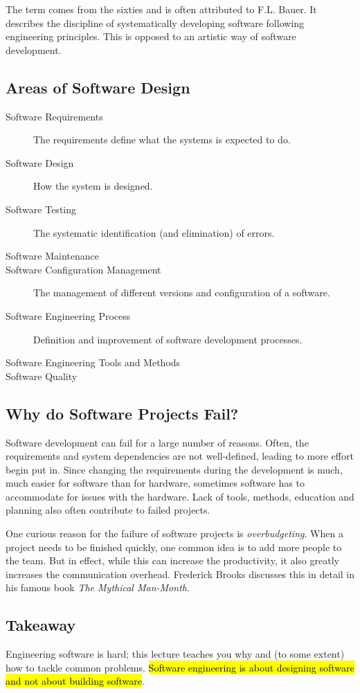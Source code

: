 \documentclass[english]{scrartcl}
\begin{document}
The term comes from the sixties and is often attributed to F.L. Bauer. It describes the discipline of systematically developing software following engineering principles. This is opposed to an artistic way of software development.

\subsection{Areas of Software Design}


\begin{description}
\item[Software Requirements] The requirements define what the systems is expected to do.
\item[Software Design] How the system is designed.
\item[Software Testing] The systematic identification (and elimination) of errors.
\item[Software Maintenance]
\item[Software Configuration Management] The management of different versions and configuration of a software.
\item[Software Engineering Process] Definition and improvement of software development processes.
\item[Software Engineering Tools and Methods]
\item[Software Quality]
\end{description}

\subsection{Why do Software Projects Fail?}

Software development can fail for a large number of reasons. Often, the requirements and system dependencies are not well-defined, leading to more effort begin put in. Since changing the requirements during the development is much, much easier for software than for hardware, sometimes software has to accommodate for issues with the hardware. Lack of tools, methods, education and planning also often contribute to failed projects.

\begin{anmerkung}
One curious reason for the failure of software projects is \emph{overbudgeting}. When a project needs to be finished quickly, one common idea is to add more people to the team. But in effect, while this can increase the productivity, it also greatly increases the communication overhead. Frederick Brooks discusses this in detail in his famous book \emph{The Mythical Man-Month}.
\end{anmerkung}


\subsection{Takeaway}

Engineering software is hard; this lecture teaches you why and (to some extent) how to tackle common problems.
\hl{Software engineering is about designing software and not about building software}.
\end{document}

